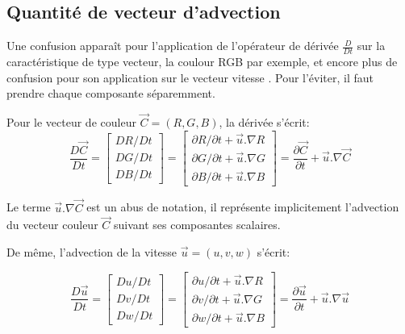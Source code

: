 \documentclass[11pt]{report}
\begin{document}
\subsection{Quantité de vecteur d'advection}

Une confusion apparaît pour l'application de l'opérateur de dérivée $ \frac{D}{Dt} $ sur la caractéristique de type vecteur, la coulour RGB par exemple, et encore plus de confusion pour son application sur le vecteur vitesse . Pour l'éviter, il faut prendre chaque composante séparemment.

Pour le vecteur de couleur $ \overrightarrow{C} = (R, G, B) $, la dérivée s'écrit:
\[
\frac{D\overrightarrow{C}}{Dt} = 
  \left[
	\begin{array}{c}
		DR/Dt\\
		DG/Dt\\
		DB/Dt
	\end{array}
 \right] = 
 \left[
	\begin{array}{c}
		\partial R/\partial t + \overrightarrow{u} . \nabla R \\
		\partial G/\partial t + \overrightarrow{u} . \nabla G \\
		\partial B/\partial t + \overrightarrow{u} . \nabla B
	\end{array}
 \right] = 
 \frac{\partial \overrightarrow{C}}{\partial t} + \overrightarrow{u} . \nabla \overrightarrow{C}
\]

Le terme $ \overrightarrow{u} . \nabla \overrightarrow{C} $ est un abus de notation, il représente implicitement l'advection du vecteur couleur $\overrightarrow{C} $ suivant ses composantes scalaires.

De même, l'advection de la vitesse $ \overrightarrow{u} = (u, v, w) $ s'écrit:

\[
\frac{D\overrightarrow{u}}{Dt} = 
  \left[
	\begin{array}{c}
		Du/Dt\\
		Dv/Dt\\
		Dw/Dt
	\end{array}
 \right] = 
 \left[
	\begin{array}{c}
		\partial u/\partial t + \overrightarrow{u} . \nabla R \\
		\partial v/\partial t + \overrightarrow{u} . \nabla G \\
		\partial w/\partial t + \overrightarrow{u} . \nabla B
	\end{array}
 \right] = 
 \frac{\partial \overrightarrow{u}}{\partial t} + \overrightarrow{u} . \nabla \overrightarrow{u}
\]
\end{document}
